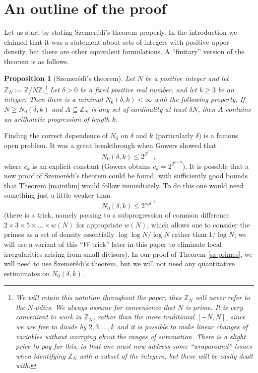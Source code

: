 \documentclass[12pt,a4paper,reqno]{amsart}
\numberwithin{equation}{section}
\theoremstyle{plain}
\newtheorem{proposition}[subsection]{Proposition}
\theoremstyle{definition}
\renewcommand{\leq}{\leqslant}
\renewcommand{\geq}{\geqslant}
\def\Z{{\mathbb Z}}
\def\w{w}
\def\vs{\vspace{11pt}}
\def\ni{\noindent}
\begin{document}
\section{An outline of the proof}

\ni Let us start by stating Szemer\'edi's theorem properly. In the introduction we claimed that it was a statement about sets of integers with positive upper density, but there are other equivalent formulations.  A ``finitary'' version of the theorem is as follows.

\begin{proposition}[Szemer\'edi's theorem]\label{sz-original}\cite{szemeredi-4,szemeredi} Let $N$ be a positive integer and let $\mathbb{Z}_N := \mathbb{Z}/N\mathbb{Z}$.\footnote{We will retain this notation throughout the paper, thus $\Z_N$ will never refer to the $N$-adics. We always assume for convenience that $N$ is prime. It is very convenient to work in $\mathbb{Z}_N$, rather than the more traditional $[-N,N]$, since we are free to divide by $2,3,\dots,k$ and it is possible to make linear changes of variables without worrying about the ranges of summation.  There is a slight price to pay for this, in that one must now address some ``wraparound'' issues when identifying $\Z_N$ with a subset of the integers, but these will be easily dealt with.}  
 Let $\delta > 0$ be a fixed positive real number, and let $k \geq 3$ be an integer. Then there is a minimal $N_0(\delta,k) < \infty$ with the following property. If $N \geq N_0(\delta,k)$ and $A \subseteq \mathbb{Z}_N$ is any set of cardinality at least $\delta N$, then $A$ contains an arithmetic progression of length $k$.
\end{proposition}

\ni Finding the correct dependence of $N_0$ on $\delta$ and $k$ (particularly $\delta$) is a famous open problem. It was a great breakthrough when Gowers \cite{gowers-4,gowers} showed that 
\[ N_0(\delta,k) \leq 2^{2^{\delta^{-c_k}}},\] where $c_k$ is an explicit constant (Gowers obtains $c_k = 2^{2^{k+9}}$). It is possible that a new proof of Szemer\'edi's theorem could be found, with sufficiently good bounds that Theorem \ref{mainthm} would follow immediately. To do this one would need something just a little weaker than\begin{equation}\label{too-hard} N_0(\delta,k) \leq 2^{c_k\delta^{-1}}\end{equation} (there is a trick, namely passing to a subprogression of common difference $2\times 3 \times 5 \times \dots \times \w(N)$ for appropriate $\w(N)$, which allows one to consider the primes as a set of density essentially $\log \log N/\log N$ rather than $1/\log N$; we will use a variant of this ``$W$-trick'' later in this paper to eliminate local irregularities arising from small divisors).  In our proof of Theorem \ref{sz-primes}, we will need to use Szemer\'edi's theorem, but we will not need any quantitative estimimates on $N_0(\delta,k)$.\vs
\end{document}
